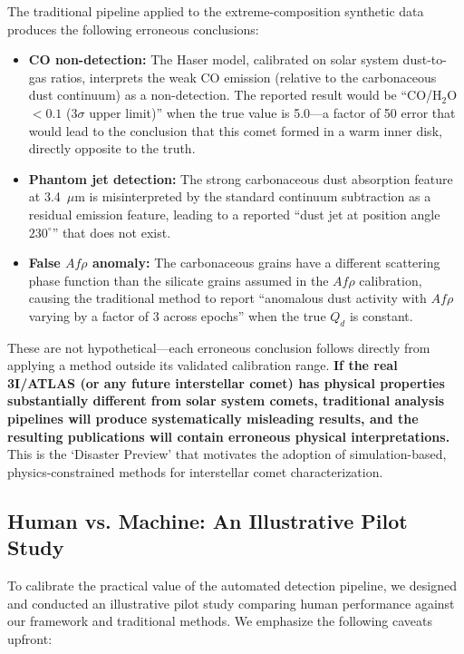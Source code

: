\documentclass[preprint2]{aastex631}
\begin{document}
The traditional pipeline applied to the extreme-composition synthetic data produces the following erroneous conclusions:

\begin{itemize}
    \item \textbf{CO non-detection:} The Haser model, calibrated on solar system dust-to-gas ratios, interprets the weak CO emission (relative to the carbonaceous dust continuum) as a non-detection. The reported result would be ``CO/H$_2$O $< 0.1$ (3$\sigma$ upper limit)'' when the true value is 5.0---a factor of 50 error that would lead to the conclusion that this comet formed in a warm inner disk, directly opposite to the truth.
    \item \textbf{Phantom jet detection:} The strong carbonaceous dust absorption feature at 3.4~$\mu$m is misinterpreted by the standard continuum subtraction as a residual emission feature, leading to a reported ``dust jet at position angle $230^\circ$'' that does not exist.
    \item \textbf{False $Af\rho$ anomaly:} The carbonaceous grains have a different scattering phase function than the silicate grains assumed in the $Af\rho$ calibration, causing the traditional method to report ``anomalous dust activity with $Af\rho$ varying by a factor of 3 across epochs'' when the true $Q_d$ is constant.
\end{itemize}

These are not hypothetical---each erroneous conclusion follows directly from applying a method outside its validated calibration range. \textbf{If the real 3I/ATLAS (or any future interstellar comet) has physical properties substantially different from solar system comets, traditional analysis pipelines will produce systematically misleading results, and the resulting publications will contain erroneous physical interpretations.} This is the `Disaster Preview' that motivates the adoption of simulation-based, physics-constrained methods for interstellar comet characterization.

\subsection{Human vs. Machine: An Illustrative Pilot Study}\label{sec:human_blind}

To calibrate the practical value of the automated detection pipeline, we designed and conducted an illustrative pilot study comparing human performance against our framework and traditional methods. We emphasize the following caveats upfront:
\end{document}
